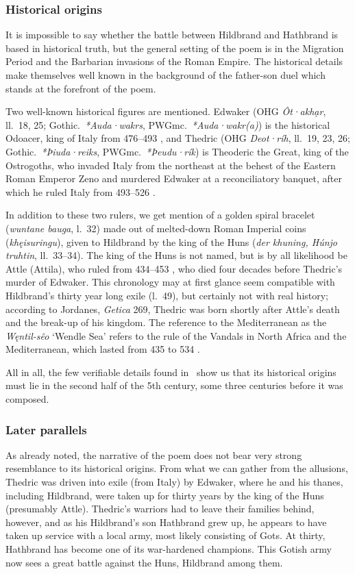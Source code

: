 \subsubsection{Historical origins}

It is impossible to say whether the battle between Hildbrand and Hathbrand is based in historical truth, but the general setting of the poem is in the Migration Period and the Barbarian invasions of the Roman Empire.  The historical details make themselves well known in the background of the father-son duel which stands at the forefront of the poem.

Two well-known historical figures are mentioned.  Edwaker (OHG \emph{Ôt·akhạr}, ll.~18, 25; Gothic.~\emph{*Auda·wakrs}, PWGmc.~\emph{*Auda·wakr(a)}) is the historical Odoacer, king of Italy from 476--493 \ce, and Thedric (OHG \emph{Deot·ríh}, ll.~19, 23, 26; Gothic.~\emph{*Þiuda·reiks}, PWGmc.~\emph{*Þeudu·rík}) is Theoderic the Great, king of the Ostrogoths, who invaded Italy from the northeast at the behest of the Eastern Roman Emperor Zeno and murdered Edwaker at a reconciliatory banquet, after which he ruled Italy from 493--526 \ce.

In addition to these two rulers, we get mention of a golden spiral bracelet (\emph{wuntane bauga}, l.~32) made out of melted-down Roman Imperial coins (\emph{khęisuringu}), given to Hildbrand by the king of the Huns (\emph{der khuning, Húnjo truhtin}, ll.~33--34).  The king of the Huns is not named, but is by all likelihood be Attle (Attila), who ruled from 434--453 \ce, who died four decades before Thedric’s murder of Edwaker.  This chronology may at first glance seem compatible with Hildbrand’s thirty year long exile (l.~49), but certainly not with real history; according to Jordanes, \emph{Getica} 269, Thedric was born shortly after Attle’s death and the break-up of his kingdom.  The reference to the Mediterranean as the \emph{Węntil-sêo} ‘Wendle Sea’ refers to the rule of the Vandals in North Africa and the Mediterranean, which lasted from 435 to 534 \ce.

All in all, the few verifiable details found in \Hildebrandslied\ show us that its historical origins must lie in the second half of the 5th century, some three centuries before it was composed.

\subsubsection{Later parallels}

As already noted, the narrative of the poem does not bear very strong resemblance to its historical origins.  From what we can gather from the allusions, Thedric was driven into exile (from Italy) by Edwaker, where he and his thanes, including Hildbrand, were taken up for thirty years by the king of the Huns (presumably Attle).  Thedric’s warriors had to leave their families behind, however, and as his Hildbrand’s son Hathbrand grew up, he appears to have taken up service with a local army, most likely consisting of Gots.  At thirty, Hathbrand has become one of its war-hardened champions.  This Gotish army now sees a great battle against the Huns, Hildbrand among them.

